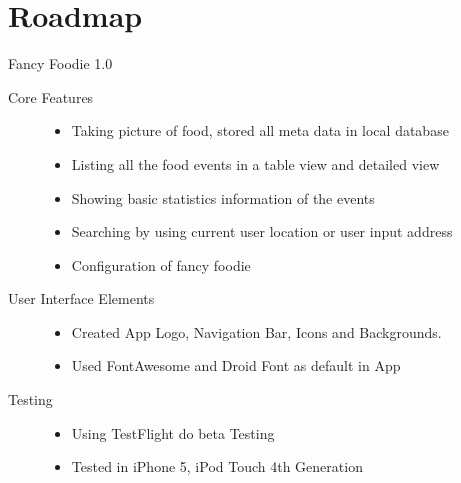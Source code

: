 \section{Roadmap} %
\label{sec:roadmap}
Fancy Foodie 1.0
\begin{description}
	\item[Core Features] \hfill 
		\begin{itemize}
		    \item Taking picture of food, stored all meta data in local database 
		    \item Listing all the food events in a table view and detailed view
			\item Showing basic statistics information of the events
			\item Searching by using current user location or user input address
			\item Configuration of fancy foodie
		 \end{itemize}
	\item[User Interface Elements] \hfill 
		\begin{itemize}
		    \item Created App Logo, Navigation Bar, Icons and Backgrounds.  
		    \item Used FontAwesome and Droid Font as default in App
		 \end{itemize}
	 \item[Testing] \hfill 
		\begin{itemize}
		    \item Using TestFlight do beta Testing 
		    \item Tested in iPhone 5, iPod Touch 4th Generation
		 \end{itemize}
\end{description}



